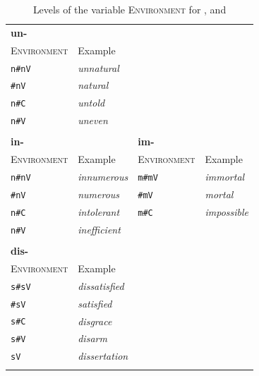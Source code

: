  
 \begin{table}
 	\caption{Levels of the variable \textsc{Environment} for ,  and }
 	\label{tbl:Levels of the variable Environment}
 	
 		\begin{tabular} {llll}
 			\lsptoprule	
 			\textbf{un-}&&&\\
 			\textsc{Environment} & Example & &\\
 			\midrule
 			\texttt{n\#nV}&\color{lsMidBlue}\textit{unnatural} &&\\ 
 			\phantom{n }\texttt{\#nV}&\color{lsMidBlue}\textit{natural}& &\\
 			\texttt{n\#C}&\color{lsMidBlue}\textit{untold} && \\ 
 			\texttt{n\#V}&\color{lsMidBlue}\textit{uneven} &&\\
 			\midrule
 			\\
 			
 			
 			\textbf{in-}&&\textbf{im-}&\\
 			\textsc{Environment }& Example &\textsc{ Environment} & Example\\
 			\midrule
 			\texttt{n\#nV}&\color{lsMidBlue}\textit{innumerous} &\texttt{m\#mV}&\color{lsMidBlue}\textit{immortal}\\ 
 			\phantom{n}\texttt{\#nV}&\color{lsMidBlue}\textit{numerous} &\phantom{n}\texttt{\#mV}&\color{lsMidBlue}\textit{mortal} \\ 
 			\texttt{n\#C}&\color{lsMidBlue}\textit{intolerant} &\texttt{m\#C}&\color{lsMidBlue}\textit{impossible} \\ 
 			\texttt{n\#V}&\color{lsMidBlue}\textit{inefficient}  &  \\ 
 			\midrule     	
 			
 			\\
 			
 			\textbf{dis-}&&&\\
 			
 			
 			\textsc{Environment}& Example && \\
 			\midrule
 			\texttt{s\#sV}&\color{lsMidBlue}\textit{dissatisfied} && \\ 
 			\phantom{s}\texttt{\#sV}&\color{lsMidBlue}\textit{satisfied} && \\ 
 			\texttt{s\#C}&\color{lsMidBlue}\textit{disgrace} & &\\ 
 			\texttt{s\#V}&\color{lsMidBlue}\textit{disarm} && \\ 
 			\texttt{sV}&\color{lsMidBlue}\textit{dissertation} && \\ 
 			\lspbottomrule   	
 			
 			
 		\end{tabular}
 	
 	
 \end{table}
 
